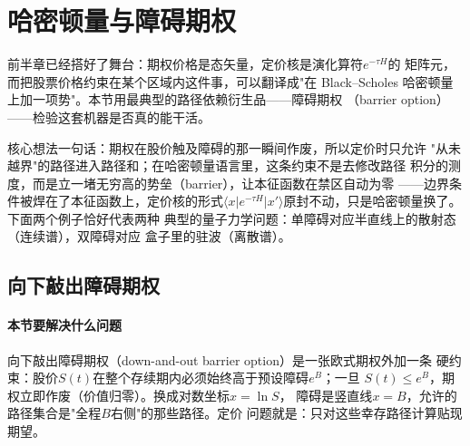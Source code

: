 
\section{哈密顿量与障碍期权}

前半章已经搭好了舞台：期权价格是态矢量，定价核是演化算符$e^{-\tau H}$的
矩阵元，而把股票价格约束在某个区域内这件事，可以翻译成"在 Black--Scholes
哈密顿量上加一项势"。本节用最典型的路径依赖衍生品——障碍期权
（barrier option）——检验这套机器是否真的能干活。

核心想法一句话：期权在股价触及障碍的那一瞬间作废，所以定价时只允许
"从未越界"的路径进入路径和；在哈密顿量语言里，这条约束不是去修改路径
积分的测度，而是立一堵无穷高的势垒（barrier），让本征函数在禁区自动为零
——边界条件被焊在了本征函数上，定价核的形式$\langle x\vert e^{-\tau H}
\vert x'\rangle$原封不动，只是哈密顿量换了。下面两个例子恰好代表两种
典型的量子力学问题：单障碍对应半直线上的散射态（连续谱），双障碍对应
盒子里的驻波（离散谱）。

\subsection{向下敲出障碍期权}

\paragraph{本节要解决什么问题}
向下敲出障碍期权（down-and-out barrier option）是一张欧式期权外加一条
硬约束：股价$S(t)$在整个存续期内必须始终高于预设障碍$e^{B}$；一旦
$S(t)\leq e^{B}$，期权立即作废（价值归零）。换成对数坐标$x=\ln S$，
障碍是竖直线$x=B$，允许的路径集合是"全程$B$右侧"的那些路径。定价
问题就是：只对这些幸存路径计算贴现期望。

